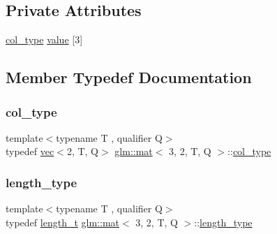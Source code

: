 \subsection*{Private Attributes}
\begin{DoxyCompactItemize}
\item 
\hyperlink{structglm_1_1mat_3_013_00_012_00_01_t_00_01_q_01_4_aa610dcaaae528e1eea8bdaaa435ad3a4}{col\+\_\+type} \hyperlink{structglm_1_1mat_3_013_00_012_00_01_t_00_01_q_01_4_a49358f69d92f2817e5ee764a5ae2cc8f}{value} \mbox{[}3\mbox{]}
\end{DoxyCompactItemize}


\subsection{Member Typedef Documentation}
\mbox{\label{structglm_1_1mat_3_013_00_012_00_01_t_00_01_q_01_4_aa610dcaaae528e1eea8bdaaa435ad3a4}} 
\subsubsection{\texorpdfstring{col\+\_\+type}{col\_type}}
{\footnotesize\ttfamily template$<$typename T , qualifier Q$>$ \\
typedef \hyperlink{structglm_1_1vec}{vec}$<$2, T, Q$>$ \hyperlink{structglm_1_1mat}{glm\+::mat}$<$ 3, 2, T, Q $>$\+::\hyperlink{structglm_1_1mat_3_013_00_012_00_01_t_00_01_q_01_4_aa610dcaaae528e1eea8bdaaa435ad3a4}{col\+\_\+type}}

\mbox{\label{structglm_1_1mat_3_013_00_012_00_01_t_00_01_q_01_4_ac2f268fa5e899b2a6ad8139183ed61d4}} 
\subsubsection{\texorpdfstring{length\+\_\+type}{length\_type}}
{\footnotesize\ttfamily template$<$typename T , qualifier Q$>$ \\
typedef \hyperlink{namespaceglm_a090a0de2260835bee80e71a702492ed9}{length\+\_\+t} \hyperlink{structglm_1_1mat}{glm\+::mat}$<$ 3, 2, T, Q $>$\+::\hyperlink{structglm_1_1mat_3_013_00_012_00_01_t_00_01_q_01_4_ac2f268fa5e899b2a6ad8139183ed61d4}{length\+\_\+type}}

